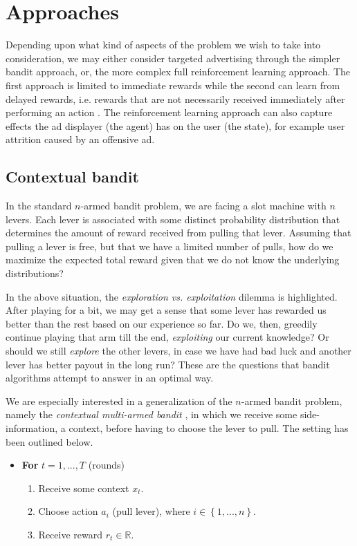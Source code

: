 \documentclass{article} %
\newcommand{\setof}[1]{\ensuremath{\left \{ #1 \right \}}}
\begin{document}
\section{Approaches}

Depending upon what kind of aspects of the problem we wish to take into
consideration, we may either consider targeted advertising through the simpler
bandit approach, or, the more complex full reinforcement learning approach. The
first approach is limited to immediate rewards while the second can learn from
delayed rewards, i.e. rewards that are not necessarily received immediately
after performing an action \cite{silver2013concurrent}. The reinforcement
learning approach can also capture effects the ad displayer (the agent) has
on the user (the state), for example user attrition caused by an offensive ad.



\subsection{Contextual bandit}

In the standard $n$-armed bandit problem, we are facing a slot machine with $n$
levers. Each lever is associated with some distinct probability distribution
that determines the amount of reward received from pulling that lever. Assuming
that pulling a lever is free, but that we have a limited number of pulls, how
do we maximize the expected total reward given that we do not know the
underlying distributions? \cite{book}

In the above situation, the \emph{exploration vs. exploitation} dilemma is
highlighted. After playing for a bit, we may get a sense that some lever has
rewarded us better than the rest based on our experience so far. Do we, then,
greedily continue playing that arm till the end, \emph{exploiting} our current
knowledge? Or should we still \emph{explore} the other levers, in case we have
had bad luck and another lever has better payout in the long run? These are the
questions that bandit algorithms attempt to answer in an optimal way.

We are especially interested in a generalization of the $n$-armed bandit
problem, namely the \emph{contextual multi-armed bandit}
\cite{langford2007epoch}, in which we receive some side-information, a context,
before having to choose the lever to pull. The setting has been outlined below.

\begin{itemize}
  \item[]
    \textbf{For} $t = 1, ..., T$ (rounds)
    \begin{enumerate}
      \item{Receive some context $x_t$.}
      \item{Choose action  $a_i$ (pull lever), where $i \in \setof{1,...,n}$.}
      \item{Receive reward $r_t \in \mathbb{R}$.}
    \end{enumerate}
\end{itemize}
\end{document}
